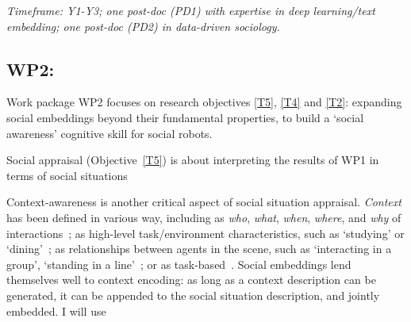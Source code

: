 \vspace{1em}
\noindent\emph{ Timeframe: Y1-Y3; one post-doc (PD1) with expertise in
    deep learning/text embedding; one post-doc (PD2) in data-driven sociology.}


\subsection{WP2: \textbf{\wpTwo}} 

Work package WP2 focuses on research objectives \ref{T5}, \ref{T4} and \ref{T2}: expanding
social embeddings beyond their fundamental properties, to build a `social
awareness' cognitive skill for social robots.





Social appraisal (Objective~\ref{T5}) is about interpreting the results of WP1
in terms of social situations

Context-awareness is another critical aspect of social situation appraisal.
\emph{Context} has been defined in various way, including as \emph{who},
\emph{what}, \emph{when}, \emph{where}, and \emph{why} of
interactions~\cite{vinciarelli2009social}; as high-level task/environment
characteristics, such as `studying' or `dining'~\cite{nigam2015social}; as
relationships between agents in the scene, such as `interacting in a group',
`standing in a line'~\cite{althaus2004navigation}; or as
task-based~\cite{castellano2012detecting}. Social embeddings lend themselves
well to context encoding: as long as a context description can be generated, it
can be appended to the social situation description, and jointly embedded.
I will use 
%


